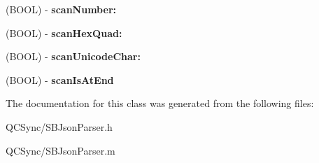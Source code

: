 \begin{DoxyCompactItemize}
\item 
\hypertarget{interface_s_b_json_parser_a40ea5a3426e2af523b6f4355fc41e0e7}{
(BOOL) -\/ {\bfseries scanNumber:}}
\label{interface_s_b_json_parser_a40ea5a3426e2af523b6f4355fc41e0e7}

\item 
\hypertarget{interface_s_b_json_parser_a940e3c61c38e199844bf1a9fbc41138d}{
(BOOL) -\/ {\bfseries scanHexQuad:}}
\label{interface_s_b_json_parser_a940e3c61c38e199844bf1a9fbc41138d}

\item 
\hypertarget{interface_s_b_json_parser_aea014e27d084f4d34e3025089c62aa74}{
(BOOL) -\/ {\bfseries scanUnicodeChar:}}
\label{interface_s_b_json_parser_aea014e27d084f4d34e3025089c62aa74}

\item 
\hypertarget{interface_s_b_json_parser_a968fa7546f80d05c2d3d53fe57a2cece}{
(BOOL) -\/ {\bfseries scanIsAtEnd}}
\label{interface_s_b_json_parser_a968fa7546f80d05c2d3d53fe57a2cece}

\end{DoxyCompactItemize}


The documentation for this class was generated from the following files:\begin{DoxyCompactItemize}
\item 
QCSync/SBJsonParser.h\item 
QCSync/SBJsonParser.m\end{DoxyCompactItemize}
